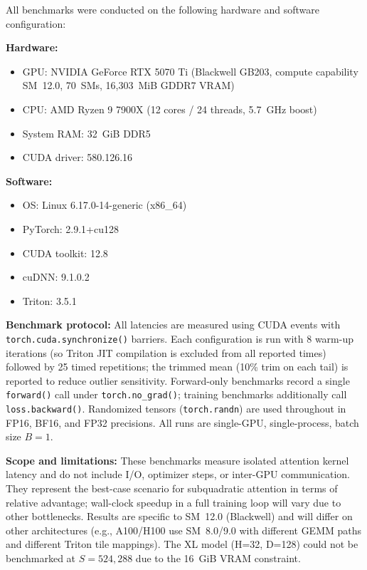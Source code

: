 \documentclass{article}
\begin{document}
    All benchmarks were conducted on the following hardware and software configuration:

    \textbf{Hardware:}
    \begin{itemize}
        \item GPU: NVIDIA GeForce RTX 5070 Ti (Blackwell GB203, compute capability SM~12.0, 70~SMs, 16{,}303~MiB GDDR7 VRAM)
        \item CPU: AMD Ryzen 9 7900X (12 cores / 24 threads, 5.7~GHz boost)
        \item System RAM: 32~GiB DDR5
        \item CUDA driver: 580.126.16
    \end{itemize}

    \textbf{Software:}
    \begin{itemize}
        \item OS: Linux 6.17.0-14-generic (x86\_64)
        \item PyTorch: 2.9.1+cu128
        \item CUDA toolkit: 12.8
        \item cuDNN: 9.1.0.2
        \item Triton: 3.5.1
    \end{itemize}

    \textbf{Benchmark protocol:} All latencies are measured using CUDA events with \texttt{torch.cuda.synchronize()} barriers. Each configuration is run with 8 warm-up iterations (so Triton JIT compilation is excluded from all reported times) followed by 25 timed repetitions; the trimmed mean (10\% trim on each tail) is reported to reduce outlier sensitivity. Forward-only benchmarks record a single \texttt{forward()} call under \texttt{torch.no\_grad()}; training benchmarks additionally call \texttt{loss.backward()}. Randomized tensors (\texttt{torch.randn}) are used throughout in FP16, BF16, and FP32 precisions. All runs are single-GPU, single-process, batch size $B=1$.

    \textbf{Scope and limitations:} These benchmarks measure isolated attention kernel latency and do not include I/O, optimizer steps, or inter-GPU communication. They represent the best-case scenario for subquadratic attention in terms of relative advantage; wall-clock speedup in a full training loop will vary due to other bottlenecks. Results are specific to SM~12.0 (Blackwell) and will differ on other architectures (e.g., A100/H100 use SM~8.0/9.0 with different GEMM paths and different Triton tile mappings). The XL model (H=32, D=128) could not be benchmarked at $S=524{,}288$ due to the 16~GiB VRAM constraint.
\end{document}
